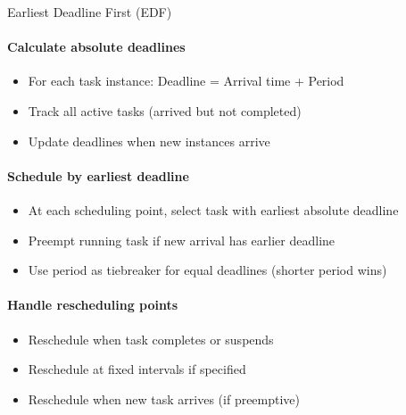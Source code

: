 \begin{KR}{Earliest Deadline First (EDF)}
    \paragraph{Calculate absolute deadlines}
    \begin{itemize}
        \item For each task instance: Deadline = Arrival time + Period
        \item Track all active tasks (arrived but not completed)
        \item Update deadlines when new instances arrive
    \end{itemize}
    
    \paragraph{Schedule by earliest deadline}
    \begin{itemize}
        \item At each scheduling point, select task with earliest absolute deadline
        \item Preempt running task if new arrival has earlier deadline
        \item Use period as tiebreaker for equal deadlines (shorter period wins)
    \end{itemize}
    
    \paragraph{Handle rescheduling points}
    \begin{itemize}
        \item Reschedule when task completes or suspends
        \item Reschedule at fixed intervals if specified
        \item Reschedule when new task arrives (if preemptive)
    \end{itemize}
\end{KR}

